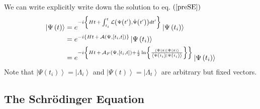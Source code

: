 \documentclass[aps,preprint]{revtex4}
\begin{document}
We can write explicitly write down the solution to eq. $\left( \ref{preSE}%
\right) $ 
\begin{align}
\left| \Psi\left( t\right) \right\rangle & =e^{-i\left\{ Ht\,+\,\int
_{t_{i}}^{t}\mathcal{L}\left( \Psi\left( t^{\prime}\right) ,\dot{\Psi }%
\left( t^{\prime}\right) \right) dt^{\prime}\right\} }\left| \Psi\left(
t_{i}\right) \right\rangle  \notag \\
& =e^{-i\left\{ Ht\,+\,\mathcal{A}\left( \Psi,\left[ t_{i},t\right] \right)
\right\} }\left| \Psi\left( t_{i}\right) \right\rangle  \notag \\
& =e^{-i\left\{ Ht\,+\,\mathcal{A}_{F}\left( \Psi,\left[ t_{i},t\right]
\right) +\frac{i}{2}\ln\left\{ \frac{\left\langle \Psi\left( t\right)
|\Psi\left( t\right) \right\rangle }{\left\langle \Psi\left( t_{i}\right)
|\Psi\left( t_{i}\right) \right\rangle }\right\} \right\} }\left| \Psi\left(
t_{i}\right) \right\rangle  \label{solution}
\end{align}
Note that $\left| \Psi\left( t_{i}\right) \right\rangle =\left|
\Lambda_{i}\right\rangle $ and $\left| \Psi\left( t\right) \right\rangle
=\left| \Lambda_{t}\right\rangle $ are arbitrary but fixed vectors.

\subsection{The Schr\"{o}dinger Equation}
\end{document}
